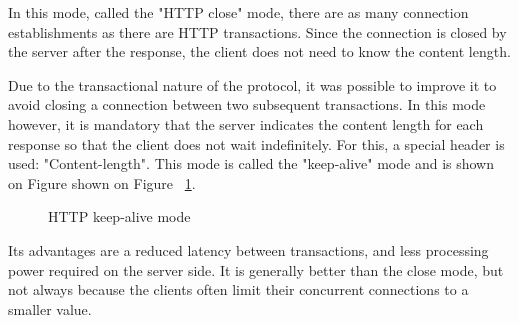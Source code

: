 In this mode, called the "HTTP close" mode, there are as many connection
establishments as there are HTTP transactions. Since the connection is closed
by the server after the response, the client does not need to know the content
length.

Due to the transactional nature of the protocol, it was possible to improve it
to avoid closing a connection between two subsequent transactions. In this mode
however, it is mandatory that the server indicates the content length for each
response so that the client does not wait indefinitely. For this, a special
header is used: "Content-length". This mode is called the "keep-alive" mode
and is shown on Figure shown on Figure ~\ref{fig:http_keep_alive}.

\begin{figure}[p]
  \centering
  \caption{HTTP keep-alive mode}
  \label{fig:http_keep_alive}
\end{figure}

Its advantages are a reduced latency between transactions, and less processing
power required on the server side. It is generally better than the close mode,
but not always because the clients often limit their concurrent connections to
a smaller value.

